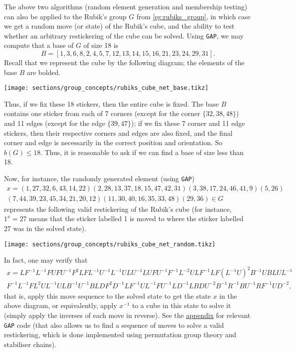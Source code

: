 \begin{example}\label{eg:rubiks_group_random}
    The above two algorithms (random element generation and membership testing) can also be applied to the Rubik's group $G$ from \autoref{eg:rubiks_group}, in which case we get a random move (or state) of the Rubik's cube, and the ability to test whether an arbitrary restickering of the cube can be solved. Using \texttt{GAP}, we may compute that a base of $G$ of size 18 is
    $$B = [ 1, 3, 6, 8, 2, 4, 5, 7, 12, 13, 14, 15, 16, 21, 23, 24, 29, 31 ].$$
    Recall that we represent the cube by the following diagram; the elements of the base $B$ are bolded.

    \begin{center}
        \texttt{[image: sections/group\_concepts/rubiks\_cube\_net\_base.tikz]}
    \end{center}
    Thus, if we fix these 18 stickers, then the entire cube is fixed. The base $B$ contains one sticker from each of 7 corners (except for the corner $\{32,38,48\}$) and 11 edges (except for the edge $\{39,47\}$); if we fix these 7 corner and 11 edge stickers, then their respective corners and edges are also fixed, and the final corner and edge is necessarily in the correct position and orientation. So $b(G) \leq 18$. Thus, it is reasonable to ask if we can find a base of size less than 18.

    Now, for instance, the randomly generated element (using \texttt{GAP})
    \begin{multline*}
        x = (1,27,32,6,43,14,22)(2,28,13,37,18,15,47,42,31)(3,38,17,24,46,41,9)(5,26)\\
        (7,44,39,23,45,34,21,20,12)(11,30,40,16,35,33,48)(29,36) \in G
    \end{multline*}
    represents the following valid restickering of the Rubik's cube (for instance, $1^x = 27$ means that the sticker labelled 1 is moved to where the sticker labelled 27 was in the solved state).

    \begin{center}
        \texttt{[image: sections/group\_concepts/rubiks\_cube\_net\_random.tikz]}
    \end{center}

    In fact, one may verify that
    \begin{multline*}
        x = LF^{-1}L^{-1}FUFU^{-1}F^2LFL^{-1}U^{-1}L^{-1}ULU^{-1}LUFU^{-1}F^{-1}L^{-2}ULF^{-1}LF(L^{-1}U)^2B^{-1}UBLUL^{-1} \\
        F^{-1}L^{-1}FL^2UL^{-1}ULB^{-1}U^{-1}BLDF^2D^{-1}LF^{-1}UL^{-1}FU^{-1}LD^{-1}LBDU^{-2}B^{-1}R^{-1}BU^{-1}RF^{-1}UD^{-2},
    \end{multline*}
    that is, apply this move sequence to the solved state to get the state $x$ in the above diagram, or equivalently, apply $x^{-1}$ to a cube in this state to solve it (simply apply the inverses of each move in reverse). See the \hyperref[app:rubiks_group]{appendix} for relevant \texttt{GAP} code (that also allows us to find a sequence of moves to solve a valid restickering, which is done implemented using permutation group theory and stabiliser chains).
\end{example}

